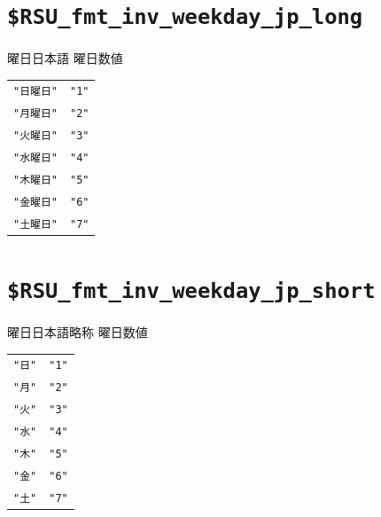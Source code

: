 \section{\texttt{\$RSU\_fmt\_inv\_weekday\_jp\_long}}
\paragraph{\DocStrTitleRDMPredefinedFormatConversion}曜日日本語  曜日数値
\begin{center}
\begin{xltabular}{\textwidth}{|p{7truecm}|X|}
\hline
\thead{\DocStrHeaderFormatInput}&\thead{\DocStrHeaderFormatOutput}\\
\hline
\hline
\texttt{"日曜日"}&\texttt{"1"}\\
\hline
\texttt{"月曜日"}&\texttt{"2"}\\
\hline
\texttt{"火曜日"}&\texttt{"3"}\\
\hline
\texttt{"水曜日"}&\texttt{"4"}\\
\hline
\texttt{"木曜日"}&\texttt{"5"}\\
\hline
\texttt{"金曜日"}&\texttt{"6"}\\
\hline
\texttt{"土曜日"}&\texttt{"7"}\\
\hline
\end{xltabular}
\end{center}
\section{\texttt{\$RSU\_fmt\_inv\_weekday\_jp\_short}}
\paragraph{\DocStrTitleRDMPredefinedFormatConversion}曜日日本語略称  曜日数値
\begin{center}
\begin{xltabular}{\textwidth}{|p{7truecm}|X|}
\hline
\thead{\DocStrHeaderFormatInput}&\thead{\DocStrHeaderFormatOutput}\\
\hline
\hline
\texttt{"日"}&\texttt{"1"}\\
\hline
\texttt{"月"}&\texttt{"2"}\\
\hline
\texttt{"火"}&\texttt{"3"}\\
\hline
\texttt{"水"}&\texttt{"4"}\\
\hline
\texttt{"木"}&\texttt{"5"}\\
\hline
\texttt{"金"}&\texttt{"6"}\\
\hline
\texttt{"土"}&\texttt{"7"}\\
\hline
\end{xltabular}
\end{center}
